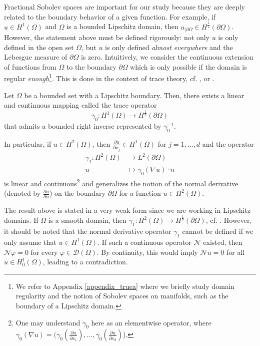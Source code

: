 Fractional Sobolev spaces are important for our study because they are deeply related to the boundary behavior of a given function. For example, if \(u \in H^1(\Omega)\) and \(\Omega\) is a bounded Lipschitz domain, then \(u_{|\partial\Omega} \in H^\frac{1}{2}(\partial\Omega)\). However, the statement above must be defined rigorously: not only \(u\) is only defined in the open set \(\Omega\), but \(u\) is only defined \textit{almost everywhere} and the Lebesgue measure of \(\partial\Omega\) is zero. Intuitively, we consider the continuous extension of functions from \(\Omega\) to the boundary \(\partial\Omega\) which is only possible if the domain is regular \textit{enough}\footnote{We refer to Appendix \ref{appendix_truea} where we briefly study domain regularity and the notion of Sobolev spaces on manifolds, such as the boundary of a Lipschitz domain.}. This is done in the context of trace theory, cf. \cite{geymonat2007trace}, \cite{necas2011direct} or \cite{adams2003sobolev}.
\begin{theorem}\label{frac_theo}
    Let \(\Omega\) be a bounded set with a Lipschitz boundary. Then, there exists a linear and continuous mapping called the trace operator
    \[
    \gamma_0: H^1(\Omega) \rightarrow H^{\frac{1}{2}}(\partial\Omega)    
    \]
    that admits a bounded right inverse represented by \(\gamma_0^{-1}\).

    In particular, if \(u \in H^2(\Omega)\), then \(\frac{\partial u}{\partial x_j} \in H^1(\Omega)\) for \(j=1,\dots,d\) and the operator
    \begin{align*}
        \gamma_1: H^2(\Omega) &\rightarrow L^2(\partial\Omega)\\
        u &\mapsto \gamma_0(\nabla u)\cdot n
    \end{align*}
    is linear and continuous\footnote{One may understand \(\gamma_0\) here as an elementwise operator, where \(\gamma_0(\nabla u) = \Big(\gamma_0(\frac{\partial u}{\partial x_1}),\dots,\gamma_0(\frac{\partial u}{\partial x_d})\)\Big).} and generalizes the notion of the normal derivative (denoted by \(\frac{\partial u}{\partial n}\)) on the boundary \(\partial\Omega\) for a function \(u \in H^2(\Omega)\).  
\end{theorem}
The result above is stated in a very weak form since we are working in Lipschitz domains. If $\Omega$ is a smooth domain, then $\gamma_1: H^2(\Omega) \rightarrow H^{\frac{1}{2}}(\partial\Omega)$, cf. \cite{lions2012non}. However, it should be noted that the normal derivative operator $\gamma_1$ cannot be defined if we only assume that $u \in H^1(\Omega)$. If such a continuous operator $\mathcal{N}$ existed, then $\mathcal{N}\varphi = 0$ for every $\varphi \in \mathcal{D}(\Omega)$. By continuity, this would imply $\mathcal{N}u=0$ for all $u \in H_0^1(\Omega)$, leading to a contradiction.

